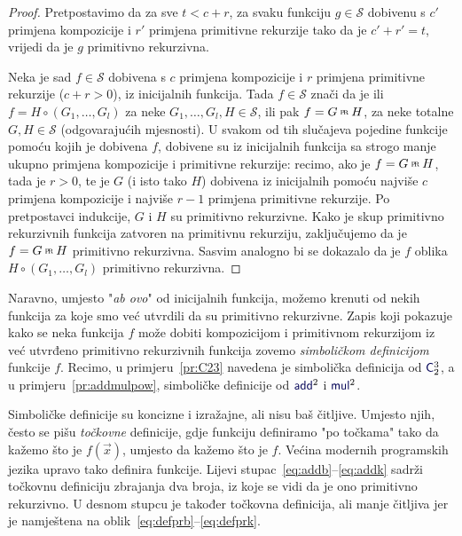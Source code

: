 \begin{proof}
Pretpostavimo da za sve $t<c+r$, za svaku funkciju $g\in\mathcal S$ dobivenu s $c'$ primjena kompozicije i $r'$ primjena primitivne rekurzije tako da je $c'+r'=t$, vrijedi da je $g$ primitivno rekurzivna.

    Neka je sad $f\in\mathcal S$ dobivena s $c$ primjena kompozicije i $r$ primjena primitivne rekurzije ($c+r>0$), iz inicijalnih funkcija. Tada $f\in\mathcal S$ znači da je ili $f=H\circ(G_1,\dotsc,G_l)$ za neke $G_1,\dotsc,G_l,H\in\mathcal S$, ili pak $f=G\pr H$, za neke totalne $G,H\in\mathcal S$ (odgovarajućih mjesnosti). U svakom od tih slučajeva pojedine funkcije pomoću kojih je dobivena $f$, dobivene su iz inicijalnih funkcija sa strogo manje ukupno primjena kompozicije i primitivne rekurzije: recimo, ako je $f=G\pr H$, tada je $r>0$, te je $G$ (i isto tako $H$) dobivena iz inicijalnih pomoću najviše $c$ primjena kompozicije i najviše $r-1$ primjena primitivne rekurzije. Po pretpostavci indukcije, $G$ i $H$ su primitivno rekurzivne. Kako je skup primitivno rekurzivnih funkcija zatvoren na primitivnu rekurziju, zaključujemo da je $f=G\pr H$ primitivno rekurzivna. Sasvim analogno bi se dokazalo da je $f$ oblika $H\circ(G_1,\dotsc,G_l)$ primitivno rekurzivna.
\end{proof}

\begin{napomena}[{name=[ulančavanje simboličkih definicija]}]\label{nap:symbdef}
Naravno, umjesto "\emph{ab ovo}" od inicijalnih funkcija, možemo krenuti od nekih funkcija za koje smo već utvrdili da su primitivno rekurzivne. Zapis koji pokazuje kako se neka funkcija $f$ može dobiti kompozicijom i primitivnom rekurzijom iz već utvrđeno primitivno rekurzivnih funkcija zovemo \emph{simboličkom definicijom} funkcije $f$. Recimo, u primjeru~\ref{pr:C23} navedena je simbolička definicija od $\f C_2^3$, a u primjeru~\ref{pr:addmulpow}, simboličke definicije od $\f{add}^2$ i $\f{mul}^2$.
\end{napomena}

Simboličke definicije su koncizne i izražajne, ali nisu baš čitljive. Umjesto njih, često se pišu \emph{točkovne} definicije, gdje funkciju definiramo "po točkama" tako da kažemo što je $f(\vec x)$, umjesto da kažemo što je $f$. Većina modernih programskih jezika upravo tako definira funkcije. Lijevi stupac~\eqref{eq:addb}--\eqref{eq:addk} sadrži točkovnu definiciju zbrajanja dva broja, iz koje se vidi da je ono primitivno rekurzivno. U desnom stupcu je također točkovna definicija, ali manje čitljiva jer je namještena na oblik~\eqref{eq:defprb}--\eqref{eq:defprk}.


